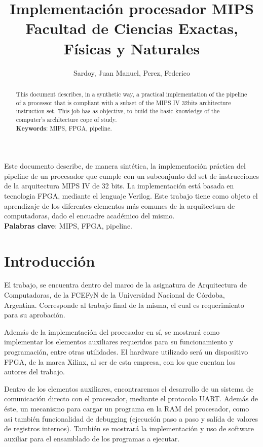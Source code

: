 \documentclass[12pt]{article}
\title{Implementación procesador MIPS\\ Facultad de Ciencias Exactas, Físicas y Naturales}
\author{Sardoy, Juan Manuel\inst{1}, Perez, Federico\inst{1}}
\begin{document}
\maketitle

\begin{resumen}
  Este documento describe, de manera sintética, la implementación práctica del pipeline de un procesador que cumple con un subconjunto del set de instrucciones de la arquitectura MIPS IV de 32 bits. La implementación está basada en tecnologia FPGA, mediante el lenguaje Verilog. Este trabajo tiene como objeto el aprendizaje de los diferentes elementos más comunes de la arquitectura de computadoras, dado el encuadre académico del mismo.\\
  \textbf{Palabras clave}: MIPS, FPGA, pipeline.
\end{resumen}

\begin{abstract}
  This document describes, in a synthetic way, a practical implementation of the pipeline of a processor that is compliant with a subset of the MIPS IV 32bits architecture instruction set. This job has as objective, to build the basic knowledge of the computer's architecture cope of study. \\
  \textbf{Keywords}: MIPS, FPGA, pipeline.
\end{abstract}

\section{Introducción}

El trabajo, se encuentra dentro del marco de la asignatura de Arquitectura de Computadoras, de la FCEFyN de la Universidad Nacional de Córdoba, Argentina. Corresponde al trabajo final de la misma, el cual es requerimiento para su aprobación.

Además de la implementación del procesador en sí, se mostrará como implementar los elementos auxiliares requeridos para su funcionamiento y programación, entre otras utilidades. El hardware utilizado será un dispositivo FPGA, de la marca Xilinx, al ser de esta empresa, con los que cuentan los autores del trabajo.

Dentro de los elementos auxiliares, encontraremos el desarrollo de un sistema de comunicación directo con el procesador, mediante el protocolo UART. Además de éste, un mecanismo para cargar un programa en la RAM del procesador, como asi también funcionalidad de debugging (ejecución paso a paso y salída de valores de registros internos). También se mostrará la implementación y uso de software auxiliar para el ensamblado de los programas a ejecutar.
\end{document}
